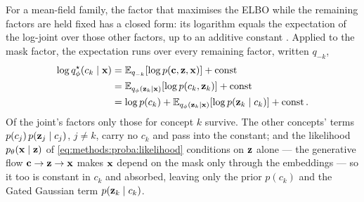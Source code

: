 For a mean-field family, the factor that maximises the \ac{ELBO} while the
remaining factors are held fixed has a closed form: its logarithm equals the
expectation of the log-joint over those other factors, up to an additive
constant \citep{bleiVariationalInferenceReview2017}. Applied to the mask factor,
the expectation runs over every remaining factor, written $q_{-k}$,
\begin{equation*}
    \begin{split}
        \log q_\phi^{\star}(c_k \mid \vb{x})
        &= \E[q_{-k}]{\log p(\vb{c}, \vb{z}, \vb{x})} + \on{const} \\
        &= \E[q_\phi(\vb{z}_k \mid \vb{x})]{\log p(c_k, \vb{z}_k)} + \on{const} \\
        &= \log p(c_k) + \E[q_\phi(\vb{z}_k \mid \vb{x})]{\log p(\vb{z}_k \mid c_k)} + \on{const}.
    \end{split}
\end{equation*}
Of the joint's factors only those for concept $k$ survive. The other concepts'
terms $p(c_j)\, p(\vb{z}_j \mid c_j)$, $j \ne k$, carry no $c_k$ and pass into the
constant; and the likelihood $p_\theta(\vb{x} \mid \vb{z})$ of
\cref{eq:methods:proba:likelihood} conditions on $\vb{z}$ alone --- the
generative flow $\vb{c} \to \vb{z} \to \vb{x}$ makes $\vb{x}$ depend on the mask
only through the embeddings --- so it too is constant in $c_k$ and absorbed,
leaving only the prior $p(c_k)$ and the Gated Gaussian term $p(\vb{z}_k \mid
c_k)$.

